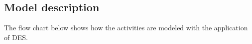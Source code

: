 \subsection{Model description}
The flow chart below shows  how the activities are modeled with the application of DES.